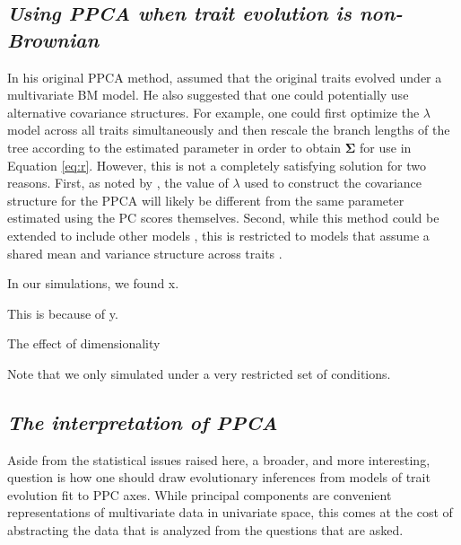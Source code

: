 \documentclass[a4paper,12pt]{article}
\begin{document}
\subsection{\emph{Using PPCA when trait evolution is non-Brownian}}
In his original PPCA method, \citet{Revell2008} assumed that the original traits evolved under a multivariate BM model. He also suggested that one could potentially use alternative covariance structures. For example, one could first optimize the $\lambda$ model \citep{Pagel1999} across all traits simultaneously \citep[using the method of][]{Freckleton2002} and then rescale the branch lengths of the tree according to the estimated parameter in order to obtain $\mathbf{\Sigma}$ for use in Equation \ref{eq:r}. However, this is not a completely satisfying solution for two reasons. First, as noted by \citet{Revell2008}, the value of $\lambda$ used to construct the covariance structure for the PPCA will likely be different from the same parameter estimated using the PC scores themselves. Second, while this method could be extended to include other models \citep{ButlerKing2009, motmot}, this is restricted to models that assume a shared mean and variance structure across traits \citep[see][for examples where this does not  apply]{Hansen2008, Bartoszek2012}.

In our simulations, we found x.

This is because of y.

The effect of dimensionality

Note that we only simulated under a very restricted set of conditions.

\subsection{\emph{The interpretation of PPCA}}

Aside from the statistical issues raised here, a broader, and more interesting, question is how one should draw evolutionary inferences from models of trait evolution fit to PPC axes. While principal components are convenient representations of multivariate data in univariate space, this comes at the cost of abstracting the data that is analyzed from the questions that are asked. 
\end{document}
